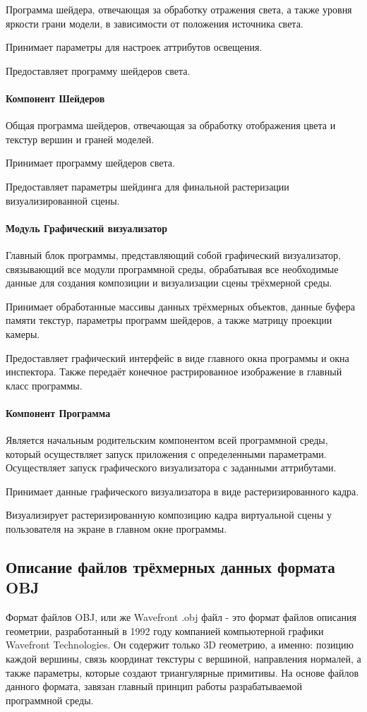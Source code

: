 Программа шейдера, отвечающая за обработку отражения света, а также уровня яркости грани модели, в зависимости от положения источника света.

Принимает параметры для настроек аттрибутов освещения.

Предоставляет программу шейдеров света.

\paragraph{Компонент Шейдеров}

Общая программа шейдеров, отвечающая за обработку отображения цвета и текстур вершин и граней моделей.

Принимает программу шейдеров света.

Предоставляет параметры шейдинга для финальной растеризации визуализированной сцены.

\paragraph{Модуль Графический визуализатор}

Главный блок программы, представляющий собой графический визуализатор, связывающий все модули программной среды, обрабатывая все необходимые данные для создания композиции и визуализации сцены трёхмерной среды.

Принимает обработанные массивы данных трёхмерных объектов, данные буфера памяти текстур, параметры программ шейдеров, а также матрицу проекции камеры.

Предоставляет графический интерфейс в виде главного окна программы и окна инспектора. Также передаёт конечное растрированное изображение в главный класс программы.

\paragraph{Компонент Программа}

Является начальным родительским компонентом всей программной среды, который осуществляет запуск приложения с определенными параметрами. Осуществляет запуск графического визуализатора с заданными аттрибутами.

Принимает данные графического визуализатора в виде растеризированного кадра.

Визуализирует растеризированную композицию кадра виртуальной сцены у пользователя на экране в главном окне программы.

\subsection{Описание файлов трёхмерных данных формата OBJ}
Формат файлов OBJ, или же Wavefront .obj файл - это формат файлов описания геометрии, разработанный в 1992 году компанией компьютерной графики Wavefront Technologies. Он содержит только 3D геометрию, а именно: позицию каждой вершины, связь координат текстуры с вершиной, направления нормалей, а также параметры, которые создают триангулярные примитивы. На основе файлов данного формата, завязан главный принцип работы разрабатываемой программной среды. 

